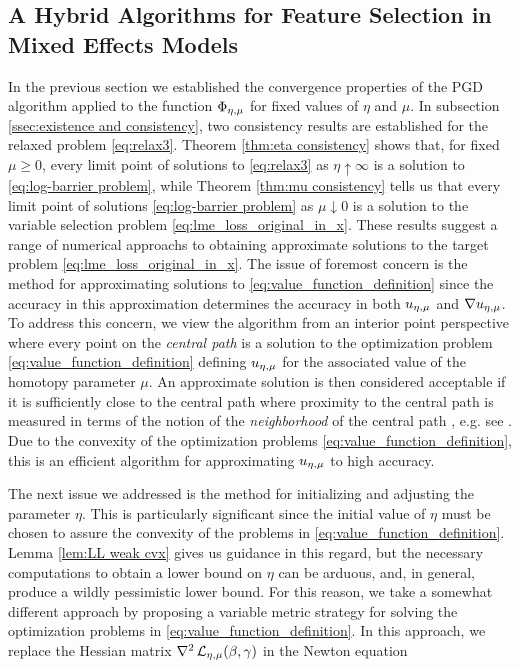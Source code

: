 \subsection{A Hybrid Algorithms for Feature Selection in Mixed Effects Models}
\label{sec:hybrid alg}

 In the previous section we established the convergence properties of the 
 PGD algorithm applied to the function $\Phi_{\eta,\mu}$ for fixed values of
 $\eta$ and $\mu$. In subsection \ref{ssec:existence and consistency},
 two consistency results are established for the relaxed problem \eqref{eq:relax3}.
 Theorem \ref{thm:eta consistency} shows that, for fixed $\mu\ge 0$,
 every limit point of solutions to \eqref{eq:relax3} as $\eta\uparrow\infty$
 is a solution to \eqref{eq:log-barrier problem}, while Theorem
 \ref{thm:mu consistency} tells us that every
 limit point of solutions \eqref{eq:log-barrier problem} as $\mu\downarrow 0$
 is a solution to the variable selection problem \eqref{eq:lme_loss_original_in_x}. 
These results suggest a range of numerical approachs to obtaining approximate 
solutions to the target problem \eqref{eq:lme_loss_original_in_x}.
 The issue of foremost concern is the method for approximating 
 solutions to \eqref{eq:value_function_definition} since the accuracy in this approximation
 determines the accuracy in both ${u_{\eta,\mu}}$ and $\nabla {u_{\eta,\mu}}$.
 To address this concern, we view the algorithm from an interior point
 perspective where every point on the {\it central path} is a solution
 to the optimization problem \eqref{eq:value_function_definition}
 defining ${u_{\eta,\mu}}$ for the associated value of the homotopy parameter $\mu$. 
 An approximate solution is then
 considered acceptable if it is sufficiently close to the central path where
 proximity to the central path is measured in terms of the notion of the 
 {\it neighborhood} of the central path , e.g. see \cite{Wright-IP-book}. 
 Due to the convexity of the optimization problems \eqref{eq:value_function_definition}, 
 this is an efficient algorithm for approximating 
 ${u_{\eta,\mu}}$ to high accuracy.
 
 The next issue we addressed is the method for initializing and adjusting the parameter 
 $\eta$.  This is particularly significant since the initial value of $\eta$ must be chosen
 to assure the convexity of the problems in \eqref{eq:value_function_definition}.
 Lemma \ref{lem:LL weak cvx} gives us guidance in this regard, but the necessary 
 computations to obtain a lower bound on $\eta$ can be arduous, and, in general,
 produce a wildly pessimistic lower bound. For this reason, we take a somewhat different 
 approach by proposing a variable metric strategy for solving the optimization problems
 in \eqref{eq:value_function_definition}. In this approach, we replace 
 the Hessian matrix $\nabla^2\operatorname{\mathcal{L}}_{{\eta,\mu}}(\beta,\gamma)$ in
 the Newton equation
 
